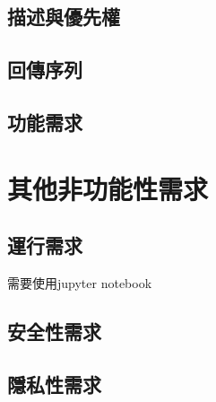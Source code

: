 \documentclass{scrreprt}
\begin{document}
\begin{CJK}{UTF8}{}
\section{描述與優先權}
\section{回傳序列}
\section{功能需求}

\chapter{其他非功能性需求}

\section{運行需求}
需要使用jupyter notebook
\section{安全性需求}

\section{隱私性需求}


\end{CJK}
\end{document}
